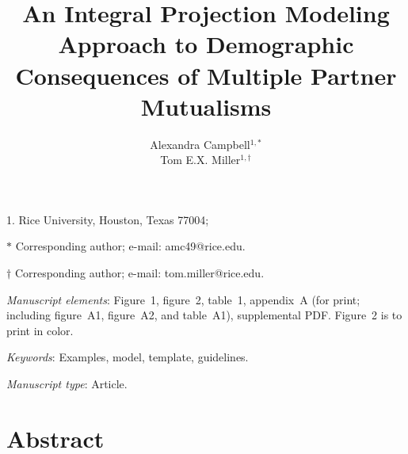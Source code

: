 \documentclass[11pt]{article}\usepackage[sc]{mathpazo} %
\title{An Integral Projection Modeling Approach to Demographic Consequences of Multiple Partner Mutualisms }
\author{Alexandra Campbell$^{1,\ast}$ \\ 
Tom E.X. Miller$^{1,\dag}$}
\date{}
\begin{document}
\maketitle

\noindent{} 1. Rice University, Houston, Texas 77004;

\noindent{} $\ast$ Corresponding author; e-mail: amc49@rice.edu.

\noindent{} $\dag$ Corresponding author; e-mail: tom.miller@rice.edu.

\textit{Manuscript elements}: Figure~1, figure~2, table~1, appendix~A (for print; including figure~A1, figure~A2, and table~A1), supplemental PDF. Figure~2 is to print in color.

\bigskip

\textit{Keywords}: Examples, model, template, guidelines.

\bigskip

\textit{Manuscript type}: Article.

\bigskip


\linenumbers{}
\modulolinenumbers[3]

\newpage{}
\section*{Abstract} 
\end{document}
